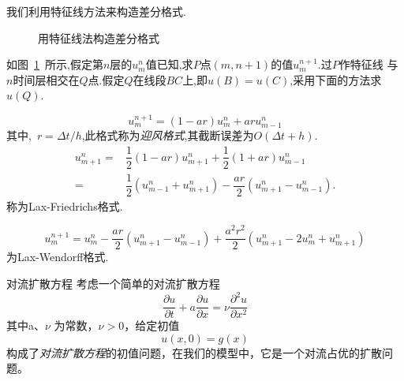 \documentclass[xcolor=svgnames]{beamer} %
\begin{document}
\begin{frame}
 我们利用特征线方法来构造差分格式.
\begin{figure}
\centering
{}
\caption{用特征线法构造差分格式\label{fig:tzx}}
\end{figure}\par
如图~\ref{fig:tzx}~所示,假定第$n$层的$u_m^n$值已知,求$P$点$(m,n+1)$的值$u_m^{n+1}$.过$P$作特征线
与$n$时间层相交在$Q$点.假定$Q$在线段$BC$上,即$u(B)=u(C)$,采用下面的方法求$u(Q)$.
\end{frame}
\begin{frame}
\begin{equation}\label{eq:04_dl_yf}
 u_m^{n+1}=(1-ar)u_m^n+aru_{m-1}^n
\end{equation}
其中,~$r=\Delta t/h$,此格式称为\emph{迎风格式},其截断误差为$O(\Delta t+h)$.
\begin{equation}\label{eq:04_dl_laxf}
\begin{split}
u_{m+1}^n =& \dfrac{1}{2}(1-ar)u_{m+1}^n+\dfrac{1}{2}(1+ar)u_{m-1}^n \\
          =& \dfrac{1}{2}(u_{m-1}^n+u_{m+1}^n)-\dfrac{ar}{2}(u_{m+1}^n-u_{m-1}^n).
\end{split}
\end{equation}
称为Lax-Friedrichs格式.\par
\begin{equation}\label{eq:04_dl_laxw}
u_m^{n+1}=u_m^n-\dfrac{ar}{2}(u_{m+1}^n-u_{m-1}^n)+\dfrac{a^2 r^2}{2}
(u_{m+1}^n-2u_m^n+u_{m+1}^n)
\end{equation}
为Lax-Wendorff格式.
\end{frame}
\begin{frame}{对流扩散方程}
考虑一个简单的对流扩散方程
\begin{equation}\label{equ:cf_dkfangc}
	\dfrac{\partial u}{\partial t}+a\dfrac{\partial u}{\partial x}=\nu\dfrac{\partial^2 u}{\partial x^2}
\end{equation}
其中a、$\nu$ 为常数，$\nu>0$，给定初值
\begin{equation}
	u(x,0)=g(x)
\end{equation}
构成了\emph{对流扩散方程}的初值问题，在我们的模型中，它是一个对流占优的扩散问题。\par
\end{frame}
\end{document}
